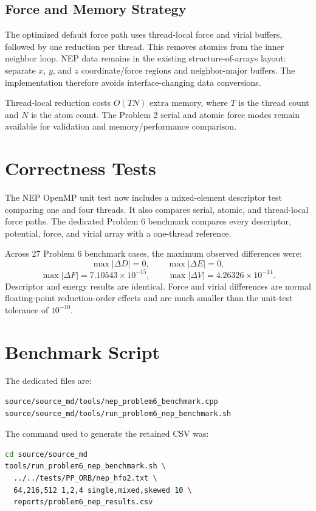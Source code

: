 \documentclass[11pt]{article}
\begin{document}
\subsection{Force and Memory Strategy}
The optimized default force path uses thread-local force and virial buffers,
followed by one reduction per thread. This removes atomics from the inner
neighbor loop. NEP data remains in the existing structure-of-arrays layout:
separate $x$, $y$, and $z$ coordinate/force regions and neighbor-major buffers.
The implementation therefore avoids interface-changing data conversions.

Thread-local reduction costs $O(TN)$ extra memory, where $T$ is the thread
count and $N$ is the atom count. The Problem 2 serial and atomic force modes
remain available for validation and memory/performance comparison.

\section{Correctness Tests}
The NEP OpenMP unit test now includes a mixed-element descriptor test comparing
one and four threads. It also compares serial, atomic, and thread-local force
paths. The dedicated Problem 6 benchmark compares every descriptor, potential,
force, and virial array with a one-thread reference.

Across 27 Problem 6 benchmark cases, the maximum observed differences were:
\[
\max|\Delta D|=0,\qquad \max|\Delta E|=0,
\]
\[
\max|\Delta F|=7.10543\times10^{-15},\qquad
\max|\Delta V|=4.26326\times10^{-14}.
\]
Descriptor and energy results are identical. Force and virial differences are
normal floating-point reduction-order effects and are much smaller than the
unit-test tolerance of $10^{-10}$.

\section{Benchmark Script}
The dedicated files are:
\begin{lstlisting}
source/source_md/tools/nep_problem6_benchmark.cpp
source/source_md/tools/run_problem6_nep_benchmark.sh
\end{lstlisting}

The command used to generate the retained CSV was:
\begin{lstlisting}[language=bash]
cd source/source_md
tools/run_problem6_nep_benchmark.sh \
  ../../tests/PP_ORB/nep_hfo2.txt \
  64,216,512 1,2,4 single,mixed,skewed 10 \
  reports/problem6_nep_results.csv
\end{lstlisting}
\end{document}
